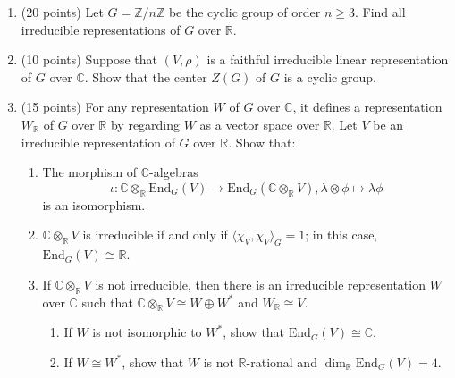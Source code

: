 \begin{enumerate}
    \item (20 points) Let $G = \mathbb{Z}/n\mathbb{Z}$ be the cyclic group of order $n \ge 3$. Find all irreducible representations of $G$ over $\mathbb{R}$.

    \item (10 points) Suppose that $(V, \rho)$ is a faithful irreducible linear representation of $G$ over $\mathbb{C}$. Show that the center $Z(G)$ of $G$ is a cyclic group.

    \item (15 points) For any representation $W$ of $G$ over $\mathbb{C}$, it defines a representation $W_\mathbb{R}$ of $G$ over $\mathbb{R}$ by regarding $W$ as a vector space over $\mathbb{R}$. Let $V$ be an irreducible representation of $G$ over $\mathbb{R}$. Show that:
    \begin{enumerate}
        \item[(1)] The morphism of $\mathbb{C}$-algebras
        \[ \iota : \mathbb{C} \otimes_\mathbb{R} \mathrm{End}_G(V) \to \mathrm{End}_G(\mathbb{C} \otimes_\mathbb{R} V), \lambda \otimes \phi \mapsto \lambda \phi \]
        is an isomorphism.
        \item[(2)] $\mathbb{C} \otimes_\mathbb{R} V$ is irreducible if and only if $\langle \chi_V, \chi_V \rangle_G = 1$; in this case, $\mathrm{End}_G(V) \cong \mathbb{R}$.
        \item[(3)] If $\mathbb{C} \otimes_\mathbb{R} V$ is not irreducible, then there is an irreducible representation $W$ over $\mathbb{C}$ such that $\mathbb{C} \otimes_\mathbb{R} V \cong W \oplus W^*$ and $W_\mathbb{R} \cong V$.
        \begin{enumerate}
            \item[(i)] If $W$ is not isomorphic to $W^*$, show that $\mathrm{End}_G(V) \cong \mathbb{C}$.
            \item[(ii)] If $W \cong W^*$, show that $W$ is not $\mathbb{R}$-rational and $\dim_\mathbb{R} \mathrm{End}_G(V) = 4$.
        \end{enumerate}
    \end{enumerate}
\end{enumerate}

